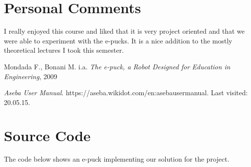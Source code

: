 \documentclass[12pt,a4paper]{article}
\begin{document}
\section*{Personal Comments}
I really enjoyed this course and liked that it is very project oriented and that we were able to experiment with the e-pucks. It is a nice addition to the mostly theoretical lectures I took this semester. 

\begin{thebibliography}{20}
Mondada F., Bonani M. i.a.
\textit{The e-puck, a Robot Designed for Education in Engineering}, 2009

\textit{Aseba User Manual}.										%
https://aseba.wikidot.com/en:asebausermanual.			%
Last visited: 20.05.15.									%
\end{thebibliography}
\appendix
\renewcommand{\thesection}{Appendix \Alph{section}}
\renewcommand{\thesubsection}{\Alph{section}.\arabic{subsection}}

\clearpage

\section{Source Code} \label{app:sourceCode}

The code below shows an e-puck implementing our solution for the project.


\end{document}
